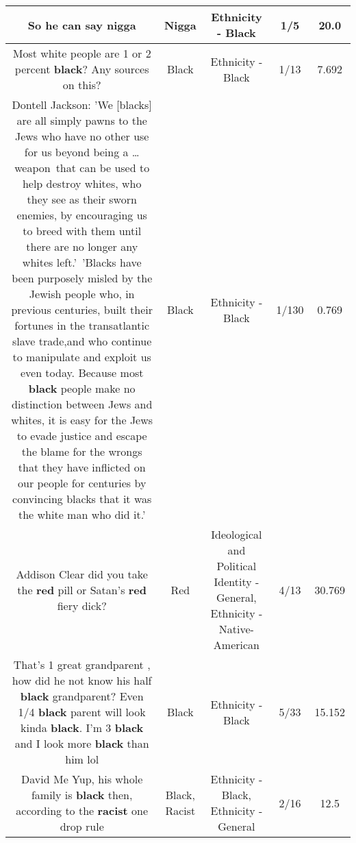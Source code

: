 \documentclass[11pt]{article}
\newlength\mylength
\begin{document}
\begin{center}
\begin{longtable}{|C{.65\mylength}|C{.30\mylength}|C{.12\mylength}|C{.12\mylength}|C{.12\mylength}|}
  \small So he can say nigga\normalsize   & Nigga & Ethnicity - Black & 1/5 & 20.0 \\  \hline
  \small Most white people are 1 or 2 percent \textbf{black}? Any sources on this?\normalsize   & Black & Ethnicity - Black & 1/13 & 7.692 \\  \hline
  \small Dontell Jackson: 'We [blacks] are all simply pawns to the Jews who have no other use for us beyond being a …weapon that can be used to help destroy whites, who they see as their sworn enemies, by encouraging us to breed with them until there are no longer any whites left.' 'Blacks have been purposely misled by the Jewish people who, in previous centuries, built their fortunes in the transatlantic slave trade,and who continue to manipulate and exploit us even today. Because most \textbf{black} people make no distinction between Jews and whites, it is easy for the Jews to evade justice and escape the blame for the wrongs that they have inflicted on our people for centuries by convincing blacks that it was the white man who did it.'\normalsize   & Black & Ethnicity - Black & 1/130 & 0.769 \\  \hline
  \small Addison Clear did you take the \textbf{r\textbf{ed}} pill or Satan's \textbf{r\textbf{ed}} fiery dick?\normalsize   & Red &  Ideological and Political Identity - General, Ethnicity - Native-American & 4/13 & 30.769 \\  \hline
  \small That's 1 great grandparent , how did he not know his half \textbf{black} grandparent? Even 1/4 \textbf{black} parent will look kinda \textbf{black}. I'm 3 \textbf{black} and I look more \textbf{black} than him lol\normalsize   & Black & Ethnicity - Black & 5/33 & 15.152 \\  \hline
  \small David Me Yup, his whole family is \textbf{black} then, according to the \textbf{racist} one drop rule\normalsize   & Black, Racist & Ethnicity - Black, Ethnicity - General & 2/16 & 12.5 \\  \hline

\end{longtable}
\end{center}
\end{document}
